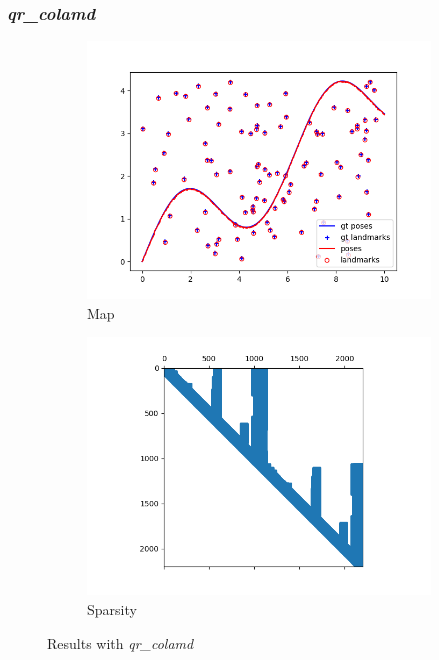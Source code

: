 \documentclass[12pt, a4paper]{article}
\begin{document}
\subsubsection{\textit{qr\_colamd}}
\begin{figure}[H]
\centering
\begin{subfigure}[b]{0.45\textwidth}
  \includegraphics[width=\textwidth]{./results/linear/qr_colamd_2d_linear_map.png}
  \caption{Map}
\end{subfigure}
\hfill
\begin{subfigure}[b]{0.45\textwidth}
  \includegraphics[width=\textwidth]{./results/linear/qr_colamd_2d_linear_sparsity.png}
  \caption{Sparsity}
\end{subfigure}
\caption{Results with \textit{qr\_colamd}}
\end{figure}
\end{document}
